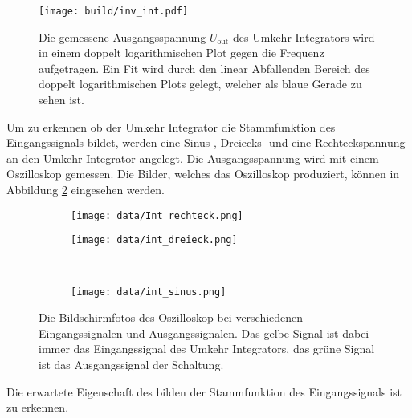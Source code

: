 \begin{figure}
    \centering
    \texttt{[image: build/inv\_int.pdf]}
    \caption{Die gemessene Ausgangsspannung $U_\text{out}$ des Umkehr Integrators wird in einem doppelt logarithmischen Plot gegen die Frequenz aufgetragen.
    Ein Fit wird durch den linear Abfallenden Bereich des doppelt logarithmischen Plots gelegt, welcher als blaue Gerade zu sehen ist.}
    \label{fig:inv_int}
\end{figure}

Um zu erkennen ob der Umkehr Integrator die Stammfunktion des Eingangssignals bildet, werden eine Sinus-, Dreiecks- und eine Rechteckspannung an den Umkehr Integrator angelegt.
Die Ausgangsspannung wird mit einem Oszilloskop gemessen.
Die Bilder, welches das Oszilloskop produziert, können in Abbildung \ref{fig:umkehr_oszi} eingesehen werden.
\begin{figure}
    \centering
    \begin{subfigure}{0.49\linewidth}%
        \texttt{[image: data/Int\_rechteck.png]}
    \end{subfigure}
    \hfill
    \begin{subfigure}{0.49\linewidth}%
        \texttt{[image: data/int\_dreieck.png]}
    \end{subfigure}\\
    \begin{subfigure}{0.49\linewidth}%
        \texttt{[image: data/int\_sinus.png]}
    \end{subfigure}
    \caption{Die Bildschirmfotos des Oszilloskop bei verschiedenen Eingangssignalen und Ausgangssignalen.
    Das gelbe Signal ist dabei immer das Eingangssignal des Umkehr Integrators, das grüne Signal ist das Ausgangssignal der Schaltung.}
    \label{fig:umkehr_oszi}
\end{figure}
Die erwartete Eigenschaft des bilden der Stammfunktion des Eingangssignals ist zu erkennen.
\FloatBarrier
